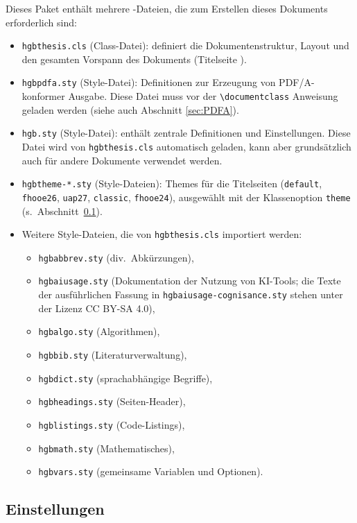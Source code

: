 Dieses Paket enthält mehrere \latex-Dateien, die zum Erstellen dieses
Dokuments erforderlich sind:
%
\begin{itemize}
  \item \nolinkurl{hgbthesis.cls} (Class-Datei): definiert die
    Dokumentenstruktur, Layout und den gesamten Vorspann des Dokuments
    (Titelseite \etc).
  \item \nolinkurl{hgbpdfa.sty} (Style-Datei): Definitionen zur
    Erzeugung von PDF/A-konformer Ausgabe. Diese Datei muss vor
    der \verb!\documentclass! Anweisung geladen werden (siehe auch Abschnitt 
    \ref{sec:PDFA}).
  \item \nolinkurl{hgb.sty} (Style-Datei): enthält zentrale Definitionen
    und Einstellungen. Diese Datei wird von \nolinkurl{hgbthesis.cls}
    automatisch geladen, kann aber grundsätzlich auch für andere Dokumente
    verwendet werden.
  \item \nolinkurl{hgbtheme-*.sty} (Style-Dateien): Themes für die Titelseiten
    (\texttt{default}, \texttt{fhooe26}, \texttt{uap27}, \texttt{classic},
    \texttt{fhooe24}),
    ausgewählt mit der Klassenoption \texttt{theme} (s.\
    Abschnitt~\ref{sec:HagenbergEinstellungen}).
  \item Weitere Style-Dateien, die von \nolinkurl{hgbthesis.cls} importiert
    werden:
    \begin{itemize}
			\item[] \nolinkurl{hgbabbrev.sty} (div.\ Abkürzungen),
			\item[] \nolinkurl{hgbaiusage.sty} (Dokumentation der Nutzung von KI-Tools;
				die Texte der ausführlichen Fassung in \nolinkurl{hgbaiusage-cognisance.sty}
				stehen unter der Lizenz CC BY-SA 4.0),
			\item[] \nolinkurl{hgbalgo.sty} (Algorithmen),
			\item[] \nolinkurl{hgbbib.sty} (Literaturverwaltung),
			\item[] \nolinkurl{hgbdict.sty} (sprachabhängige Begriffe),
			\item[] \nolinkurl{hgbheadings.sty} (Seiten-Header),
			\item[] \nolinkurl{hgblistings.sty} (Code-Listings),
			\item[] \nolinkurl{hgbmath.sty} (Mathematisches),
			\item[] \nolinkurl{hgbvars.sty} (gemeinsame Variablen und Optionen).
    \end{itemize}
\end{itemize}


\subsection{Einstellungen}
\label{sec:HagenbergEinstellungen}

